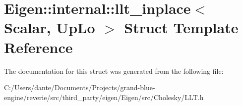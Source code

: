 \hypertarget{struct_eigen_1_1internal_1_1llt__inplace}{}\section{Eigen\+::internal\+::llt\+\_\+inplace$<$ Scalar, Up\+Lo $>$ Struct Template Reference}
\label{struct_eigen_1_1internal_1_1llt__inplace}


The documentation for this struct was generated from the following file\+:\begin{DoxyCompactItemize}
\item 
C\+:/\+Users/dante/\+Documents/\+Projects/grand-\/blue-\/engine/reverie/src/third\+\_\+party/eigen/\+Eigen/src/\+Cholesky/L\+L\+T.\+h\end{DoxyCompactItemize}
